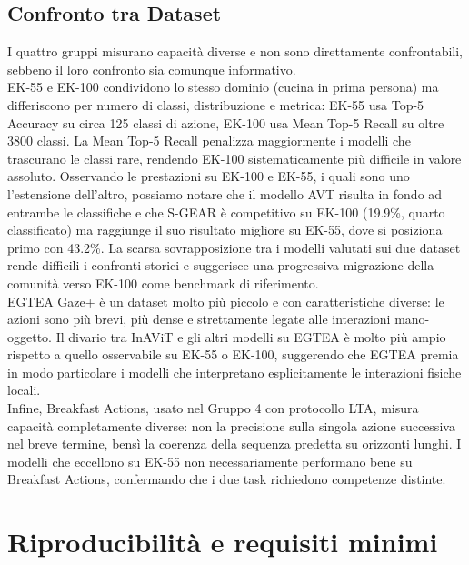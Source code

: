 \subsection{Confronto tra Dataset}
I quattro gruppi misurano capacità diverse e non sono direttamente confrontabili, sebbeno il loro confronto sia comunque informativo. \\
EK-55 e EK-100 condividono lo stesso dominio (cucina in prima persona) ma differiscono per numero di classi, distribuzione e metrica: EK-55 usa Top-5 Accuracy su circa 125 classi di azione, EK-100 usa Mean Top-5 Recall su oltre 3800 classi. La Mean Top-5 Recall penalizza maggiormente i modelli che trascurano le classi rare, rendendo EK-100 sistematicamente più difficile in valore assoluto. Osservando le prestazioni su EK-100 e EK-55, i quali sono uno l'estensione dell’altro, possiamo notare che il modello AVT \cite{girdhar2021anticipative} risulta in fondo ad entrambe le classifiche e che S-GEAR \cite{diko2024semantically} è competitivo su EK-100 (19.9\%, quarto classificato) ma raggiunge il suo risultato migliore su EK-55, dove si posiziona primo con 43.2\%. La scarsa sovrapposizione tra i modelli valutati sui due dataset rende difficili i confronti storici e suggerisce una progressiva migrazione della comunità verso EK-100 come benchmark di riferimento. \\
EGTEA Gaze+ è un dataset molto più piccolo e con caratteristiche diverse: le azioni sono più brevi, più dense e strettamente legate alle interazioni mano-oggetto. Il divario tra InAViT \cite{roy2024interaction} e gli altri modelli su EGTEA è molto più ampio rispetto a quello osservabile su EK-55 o EK-100, suggerendo che EGTEA premia in modo particolare i modelli che interpretano esplicitamente le interazioni fisiche locali. \\
Infine, Breakfast Actions, usato nel Gruppo 4 con protocollo LTA, misura capacità completamente diverse: non la precisione sulla singola azione successiva nel breve termine, bensì la coerenza della sequenza predetta su orizzonti lunghi. I modelli che eccellono su EK-55 non necessariamente performano bene su Breakfast Actions, confermando che i due task richiedono competenze distinte.

\section{Riproducibilità e requisiti minimi}
\label{riprod}
